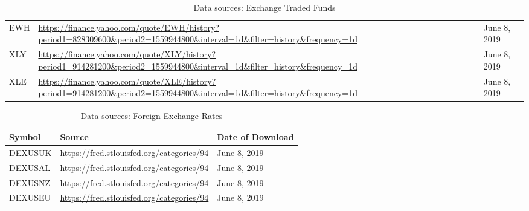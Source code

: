 \documentclass[12pt, a4paper]{article}
\begin{document}
\begin{table}[H]
\begin{tabular}{p{3.0cm} p{10.0cm}l}
        EWH                                                                         & \url{https://finance.yahoo.com/quote/EWH/history?period1=828309600\&period2=1559944800\&interval=1d\&filter=history\&frequency=1d}          & June 8, 2019              \\
        XLY                                                                         & \url{https://finance.yahoo.com/quote/XLY/history?period1=914281200\&period2=1559944800\&interval=1d\&filter=history\&frequency=1d}          & June 8, 2019              \\
        XLE                                                                         & \url{https://finance.yahoo.com/quote/XLE/history?period1=914281200\&period2=1559944800\&interval=1d\&filter=history\&frequency=1d}          & June 8, 2019              \\ \hline
        \end{tabular}
        \caption{Data sources: Exchange Traded Funds}
        \label{tbl:datasets_etfs}
    \end{table}
        
        \begin{table}[H]
    \centering
        \begin{tabular}{p{3.0cm} p{10.0cm}l}
        \hline
        \textbf{Symbol}                                                             & \textbf{Source}                                                                                                                                              & \textbf{Date of Download} \\ \hline
        DEXUSUK                                                                     & \url{https://fred.stlouisfed.org/categories/94}                                                                                             & June 8, 2019              \\
        DEXUSAL                                                                     & \url{https://fred.stlouisfed.org/categories/94}                                                                                             & June 8, 2019              \\
        DEXUSNZ                                                                     & \url{https://fred.stlouisfed.org/categories/94}                                                                                             & June 8, 2019              \\
        DEXUSEU                                                                     & \url{https://fred.stlouisfed.org/categories/94}                                                                                             & June 8, 2019              \\ \hline
       \end{tabular}
        \caption{Data sources: Foreign Exchange Rates}
        \label{tbl:datasets_FX}
    \end{table}
    
\end{document}
